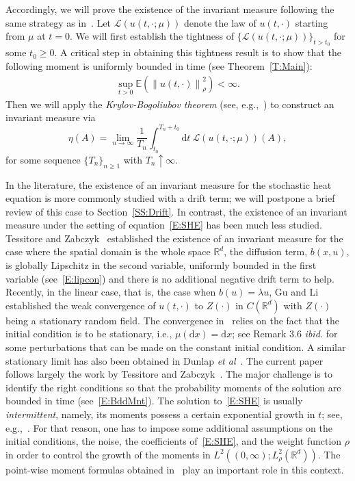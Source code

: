 \documentclass[sn-mathphys]{sn-jnl}%
\renewcommand{\R}{\mathbb{R}}
\newcommand{\E}{\mathbb{E}}
\newcommand{\Norm}[1]{\left\| #1 \right\|}
\newcommand{\ud}{\ensuremath{\mathrm{d}}}
\numberwithin{equation}{section}
\theoremstyle{thmstyleone}%
\theoremstyle{thmstyletwo}%
\theoremstyle{thmstylethree}%
\begin{document}
Accordingly, we will prove the existence of the invariant measure following the same strategy as
in~\cite{tessitore.zabczyk:98:invariant}. Let $\mathscr{L}(u(t,\cdot;\mu))$ denote the law of
$u(t,\cdot)$ starting from $\mu$ at $t = 0$. We will first establish the tightness of
$\{\mathscr{L}(u(t,\cdot;\mu))\}_{t>t_0}$ for some $ t_0\ge 0$. A critical step in obtaining this
tightness result is to show that the following moment is uniformly bounded in time (see
Theorem~\ref{T:Main}):
\begin{align}\label{E:BddMnt}
  \sup_{t>0} \E\left(\Norm{u(t,\cdot)}_{\rho}^2\right) <\infty.
\end{align}
Then we will apply the \textit{Krylov-Bogoliubov theorem} (see,
e.g.,~\cite[Theorem~11.7]{da-prato.zabczyk:14:stochastic}) to construct an invariant measure via
\begin{equation}\label{E:InvMeasForm}
  \eta(A) = \lim_{n \to \infty} \frac{1}{T_n} \int_{t_0}^{T_n + t_0} \ud t\: \mathscr{L}(u(t,\cdot; \mu))(A),
\end{equation}
for some sequence $\{T_n\}_{n\ge 1}$ with $T_n\uparrow \infty$. \medskip

In the literature, the existence of an invariant measure for the stochastic heat equation is more
commonly studied with a drift term; we will postpone a brief review of this case to
Section~\ref{SS:Drift}. In contrast, the existence of an invariant measure under the setting of
equation~\eqref{E:SHE} has been much less studied. Tessitore and
Zabczyk~\cite{tessitore.zabczyk:98:invariant} established the existence of an invariant measure for
the case where the spatial domain is the whole space $\R^d$, the diffusion term, $b(x,u)$, is
globally Lipschitz in the second variable, uniformly bounded in the first variable
(see~\eqref{E:lipcon}) and there is no additional negative drift term to help. Recently, in the
linear case, that is, the case when $b(u) = \lambda u$, Gu and Li~\cite{gu.li:20:fluctuations}
established the weak convergence of $u(t,\cdot)$ to $Z(\cdot)$ in $C(\R^d)$ with $Z(\cdot)$ being a
stationary random field. The convergence in~\cite{gu.li:20:fluctuations} relies on the fact that the
initial condition is to be stationary, i.e., $\mu(\ud x) = \ud x$; see Remark 3.6 {\it ibid.} for
some perturbations that can be made on the constant initial condition. A similar stationary limit has
also been obtained in Dunlap {\it et al}~\cite{dunlap.gu.ea:21:random}. The current paper follows
largely the work by Tessitore and Zabczyk~\cite{tessitore.zabczyk:98:invariant}. The major challenge
is to identify the right conditions so that the probability moments of the solution are bounded in
time (see~\eqref{E:BddMnt}). The solution to~\eqref{E:SHE} is usually \textit{intermittent}, namely,
its moments possess a certain exponential growth in $t$; see,
e.g.,~\cite{carmona.molchanov:94:parabolic,foondun.khoshnevisan:09:intermittence}. For that reason,
one has to impose some additional assumptions on the initial conditions, the noise, the coefficients
of~\eqref{E:SHE}, and the weight function $\rho$ in order to control the growth of the moments in
$L^2\left((0,\infty); L_\rho^2(\R^d)\right)$. The point-wise moment formulas obtained
in~\cite{chen.huang:19:comparison,chen.kim:19:nonlinear} play an important role in this context.
\end{document}
